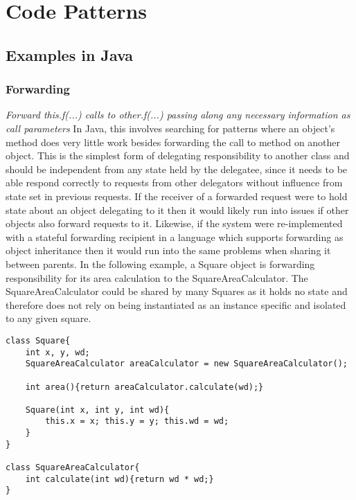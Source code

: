 \chapter{Code Patterns}\label{C:bg}

\section{Examples in Java}
\subsection{Forwarding}
\textit{Forward this.f(...) calls to other.f(...) passing along any necessary information as call parameters} \newline\newline
In Java, this involves searching for patterns where an object’s method does very little work besides forwarding the call to method on another object. This is the simplest form of delegating responsibility to another class and should be independent from any state held by the delegatee, since it needs to be able respond correctly to requests from other delegators without influence from state set in previous requests.\newline 
If the receiver of a forwarded request were to hold state about an object delegating to it then it would likely run into issues if other objects also forward requests to it. Likewise, if the system were re-implemented with a stateful forwarding recipient in a language which supports forwarding as object inheritance then it would run into the same problems when sharing it between parents.\newline
In the following example, a Square object is forwarding responsibility for its area calculation to the SquareAreaCalculator. The SquareAreaCalculator could be shared by many Squares as it holds no state and therefore does not rely on being instantiated as an instance specific and isolated to any given square.

\begin{lstlisting}
class Square{
	int x, y, wd;
	SquareAreaCalculator areaCalculator = new SquareAreaCalculator();
	
	int area(){return areaCalculator.calculate(wd);}
	
	Square(int x, int y, int wd){
		this.x = x; this.y = y; this.wd = wd;
	}
}

class SquareAreaCalculator{
	int calculate(int wd){return wd * wd;}
}
\end{lstlisting}

